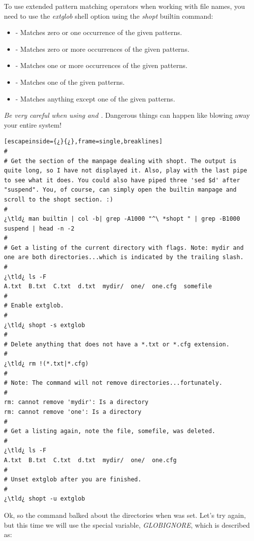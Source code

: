 To use extended pattern matching operators when working with file names, you need to use the \emph{extglob} shell option using the \emph{shopt} builtin command:

\begin{itemize}
	\item[]  - Matches zero or one occurrence of the given patterns.
	\item[]  - Matches zero or more occurrences of the given patterns.
	\item[]  - Matches one or more occurrences of the given patterns.
	\item[]  - Matches one of the given patterns.
	\item[]  - Matches anything except one of the given patterns.
\end{itemize}

\emph{Be very careful when using  and .} Dangerous things can happen like blowing away your entire system!

\begin{lstlisting}[escapeinside={¿}{¿},frame=single,breaklines]
#
# Get the section of the manpage dealing with shopt. The output is quite long, so I have not displayed it. Also, play with the last pipe to see what it does. You could also have piped three 'sed $d' after "suspend". You, of course, can simply open the builtin manpage and scroll to the shopt section. :)
#
¿\tld¿ man builtin | col -b| grep -A1000 "^\ *shopt " | grep -B1000 suspend | head -n -2
#
# Get a listing of the current directory with flags. Note: mydir and one are both directories...which is indicated by the trailing slash.
#
¿\tld¿ ls -F
A.txt  B.txt  C.txt  d.txt  mydir/  one/  one.cfg  somefile
#
# Enable extglob.
#
¿\tld¿ shopt -s extglob
#
# Delete anything that does not have a *.txt or *.cfg extension.
#
¿\tld¿ rm !(*.txt|*.cfg)
#
# Note: The command will not remove directories...fortunately.
#
rm: cannot remove 'mydir': Is a directory
rm: cannot remove 'one': Is a directory
#
# Get a listing again, note the file, somefile, was deleted.
#
¿\tld¿ ls -F
A.txt  B.txt  C.txt  d.txt  mydir/  one/  one.cfg
#
# Unset extglob after you are finished.
#
¿\tld¿ shopt -u extglob
\end{lstlisting}

Ok, so the  command balked about the directories when  was set. Let's try again, but this time we will use the special variable, \emph{GLOBIGNORE}, which is described as:

